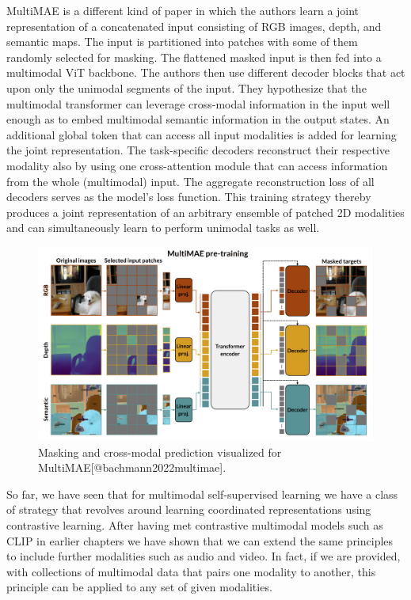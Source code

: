 \documentclass[
]{krantz}
\begin{document}
MultiMAE \citep{bachmann2022multimae} is a different kind of paper in which the authors learn a joint representation of a concatenated input consisting of RGB images, depth, and semantic maps. The input is partitioned into patches with some of them randomly selected for masking. The flattened masked input is then fed into a multimodal ViT \citep{DosovitskiyB0WZ21} backbone. The authors then use different decoder blocks that act upon only the unimodal segments of the input. They hypothesize that the multimodal transformer can leverage cross-modal information in the input well enough as to embed multimodal semantic information in the output states. An additional global token that can access all input modalities is added for learning the joint representation. The task-specific decoders reconstruct their respective modality also by using one cross-attention module that can access information from the whole (multimodal) input. The aggregate reconstruction loss of all decoders serves as the model's loss function. This training strategy thereby produces a joint representation of an arbitrary ensemble of patched 2D modalities and can simultaneously learn to perform unimodal tasks as well.

\begin{figure}

{\centering \includegraphics[width=1\linewidth]{figures/03-01/multimae} 

}

\caption{Masking and cross-modal prediction visualized for MultiMAE[@bachmann2022multimae].}\label{fig:multimae}
\end{figure}

So far, we have seen that for multimodal self-supervised learning we have a class of strategy that revolves around learning coordinated representations using contrastive learning. After having met contrastive multimodal models such as CLIP in earlier chapters we have shown that we can extend the same principles to include further modalities such as audio and video. In fact, if we are provided, with collections of multimodal data that pairs one modality to another, this principle can be applied to any set of given modalities.
\end{document}
